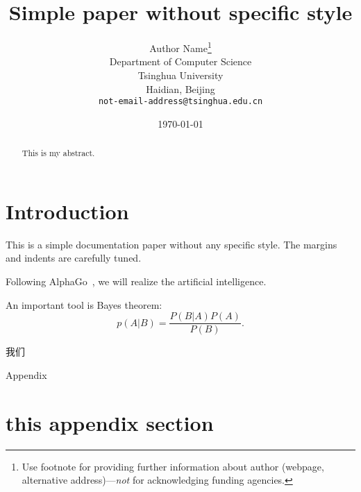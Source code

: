 \documentclass[11pt]{article}
\begin{document}
\title{Simple paper without specific style}
\author{Author Name\thanks{Use footnote for providing further information
    about author (webpage, alternative address)---\emph{not} for acknowledging
    funding agencies.} \\
  Department of Computer Science\\
  Tsinghua University\\
  Haidian, Beijing \\
  \texttt{not-email-address@tsinghua.edu.cn} \\
}
\date{\today}
\maketitle
%



\begin{abstract}
This is my abstract.
\end{abstract}


\section{Introduction}
This is a simple documentation paper without any specific style. The margins and indents are carefully tuned. 

Following AlphaGo~\cite{silver2016mastering}, we will realize the artificial intelligence.

An important tool is Bayes theorem:
\begin{equation}
    p(A|B) = \frac{P(B|A)P(A)}{P(B)}.
\end{equation}

我们




\clearpage
{\centering \huge Appendix}
\appendix
\section{this appendix section}
\end{document}

